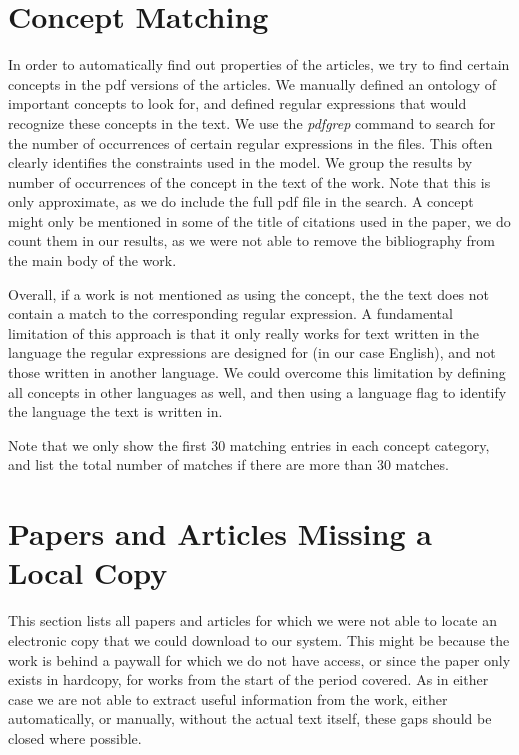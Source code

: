 \documentclass[a4paper]{article}
\begin{document}


\clearpage
\section{Concept Matching}

In order to automatically find out properties of the articles, we try to find certain concepts in the pdf versions of the articles. We manually defined an ontology of important concepts to look for, and defined regular expressions that would recognize these concepts in the text. We use the \emph{pdfgrep} command to search for the number of occurrences of certain regular expressions in the files. This often clearly identifies the constraints used in the model. We group the results by number of occurrences of the concept in the text of the work. Note that this is only approximate, as we do include the full pdf file in the search. A concept might only be mentioned in some of the title of citations used in the paper, we do count them in our results, as we were not able to remove the bibliography from the main body of the work.

Overall, if a work is not mentioned as using the concept, the the text does not contain a match to the corresponding regular expression. A fundamental limitation of this approach is that it only really works for text written in the language the regular expressions are designed for (in our case English), and not those written in another language. We could overcome this limitation by defining all concepts in other languages as well, and then using a language flag to identify the language the text is written in. 

Note that we only show the first 30 matching entries in each concept category, and list the total number of matches if there are more than 30 matches.





\clearpage
{}
{}





\appendix
\clearpage
\section{Papers and Articles Missing a Local Copy}

This section lists all papers and articles for which we were not able to locate an electronic copy that we could download to our system. This might be because the work is behind a paywall for which we do not have access, or since the paper only exists in hardcopy, for works from the start of the period covered. As in either case we are not able to extract useful information from the work, either automatically, or manually, without the actual text itself, these gaps should be closed where possible.
\end{document}
